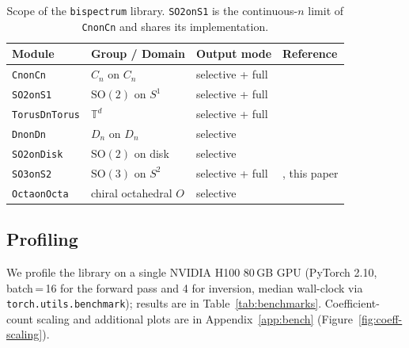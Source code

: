 \documentclass{article}
\theoremstyle{definition}
\theoremstyle{remark}
\newcommand{\SO}{\mathrm{SO}}
\theoremstyle{definition}
\begin{document}
\begin{table}[t]
  \caption{Scope of the \texttt{bispectrum} library.
    \texttt{SO2onS1} is the continuous-$n$ limit of \texttt{CnonCn}
    and shares its implementation.}
  \label{tab:supported-groups}
  \centering
  \small
  \begin{tabular}{llll}
    \toprule
    Module & Group / Domain & Output mode & Reference \\
    \midrule
    \texttt{CnonCn} & $C_n$ on $C_n$ & selective + full & \citep{sanborn2023bispectral} \\
    \texttt{SO2onS1} & $\SO(2)$ on $S^1$ & selective + full & \citep{mataigne2024selective} \\
    \texttt{TorusDnTorus} & $\mathbb{T}^d$ & selective + full & \citep{mataigne2024selective} \\
    \texttt{DnonDn} & $D_n$ on $D_n$ & selective & \citep{mataigne2024selective} \\
    \texttt{SO2onDisk} & $\SO(2)$ on disk & selective & \citep{myers2025selective} \\
    \texttt{SO3onS2} & $\SO(3)$ on $S^2$ & selective + full & \citep{kakarala2012bispectrum}, this paper \\
    \texttt{OctaonOcta} & chiral octahedral $O$ & selective & \citep{mataigne2024selective} \\
    \bottomrule
  \end{tabular}
\end{table}

\subsection{Profiling}
\label{sec:benchmarks}

We profile the library on a single NVIDIA H100 80\,GB GPU
(PyTorch 2.10, batch\,=\,16 for the forward pass and 4 for inversion,
median wall-clock via \texttt{torch.utils.benchmark}); results are in
Table~\ref{tab:benchmarks}. Coefficient-count scaling and additional
plots are in Appendix~\ref{app:bench}
(Figure~\ref{fig:coeff-scaling}).
\end{document}
